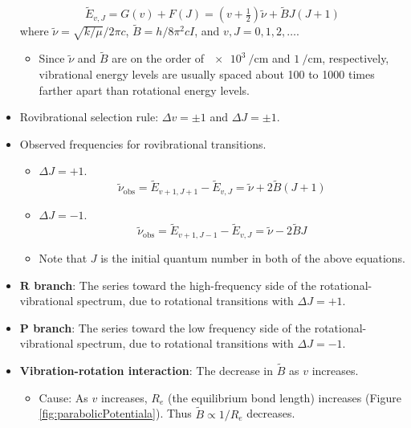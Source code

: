 \documentclass[../notes.tex]{subfiles}
\begin{document}
\begin{itemize}
    \begin{equation*}
        \tilde{E}_{v,J} = G(v)+F(J) = (v+\tfrac{1}{2})\tilde{\nu}+\tilde{B}J(J+1)
    \end{equation*}
    where $\tilde{\nu}=\sqrt{k/\mu}/2\pi c$, $\tilde{B}=h/8\pi ^2cI$, and $v,J=0,1,2,\dots$.
    \begin{itemize}
        \item Since $\tilde{\nu}$ and $\tilde{B}$ are on the order of $\SI{e3}{\per\centi\meter}$ and $\SI{1}{\per\centi\meter}$, respectively, vibrational energy levels are usually spaced about 100 to 1000 times farther apart than rotational energy levels.
    \end{itemize}
    \item Rovibrational selection rule: $\Delta v=\pm 1$ and $\Delta J=\pm 1$.
    \item Observed frequencies for rovibrational transitions.
    \begin{itemize}
        \item $\Delta J=+1$.
        \begin{equation*}
            \tilde{\nu}_\text{obs} = \tilde{E}_{v+1,J+1}-\tilde{E}_{v,J} = \tilde{\nu}+2\tilde{B}(J+1)
        \end{equation*}
        \item $\Delta J=-1$.
        \begin{equation*}
            \tilde{\nu}_\text{obs} = \tilde{E}_{v+1,J-1}-\tilde{E}_{v,J} = \tilde{\nu}-2\tilde{B}J
        \end{equation*}
        \item Note that $J$ is the initial quantum number in both of the above equations.
    \end{itemize}
    \item \textbf{$\bm{R}$ branch}: The series toward the high-frequency side of the rotational-vibrational spectrum, due to rotational transitions with $\Delta J=+1$.
    \item \textbf{$\bm{P}$ branch}: The series toward the low frequency side of the rotational-vibrational spectrum, due to rotational transitions with $\Delta J=-1$.
    \item \textbf{Vibration-rotation interaction}: The decrease in $\tilde{B}$ as $v$ increases.
    \begin{itemize}
        \item Cause: As $v$ increases, $R_e$ (the equilibrium bond length) increases (Figure \ref{fig:parabolicPotentiala}). Thus $\tilde{B}\propto 1/R_e$ decreases.

\end{itemize}
\end{itemize}
\end{document}
